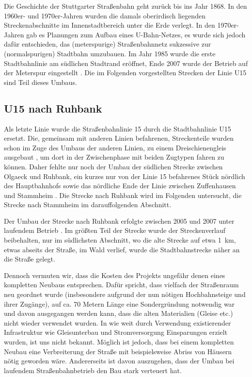 Die Geschichte der Stuttgarter Straßenbahn geht zurück bis ins Jahr 1868. In den
1960er- und 1970er-Jahren wurden die damals oberirdisch liegenden
Streckenabschnitte im Innenstadtbereich unter die Erde verlegt. In den
1970er-Jahren gab es Planungen zum Aufbau eines U-Bahn-Netzes, es wurde sich
jedoch dafür entschieden, das (meterspurige) Straßenbahnnetz sukzessive zur
(normalspurigen) Stadtbahn umzubauen. Im Jahr 1985 wurde die erste
Stadtbahnlinie am südlichen Stadtrand eröffnet, Ende 2007 wurde der Betrieb auf
der Meterspur eingestellt \cite{SSBgeschichte}. Die im Folgenden vorgestellten
Strecken der Linie U15 sind Teil dieses Umbaus.

\subsection*{U15 nach Ruhbank}

Als letzte \cite{u15vorinfo} Linie wurde die Straßenbahnlinie 15 durch die
Stadtbahnlinie U15 ersetzt. Die, gemeinsam mit anderen Linien befahrenen,
Streckenteile wurden schon im Zuge des Umbaus der anderen Linien, zu einem
Dreischienengleis ausgebaut \cite{beob}, um dort in der Zwischenphase mit beiden
Zugtypen fahren zu können. Daher fehlte nur noch der Umbau der südlichen
Strecke zwischen Olgaeck und Ruhbank, ein kurzes nur von der Linie 15 befahrenes
Stück nördlich des Hauptbahnhofs sowie das nördliche Ende der Linie zwischen
Zuffenhausen und Stammheim \cite{u15mail}. Die Strecke nach Ruhbank wird im
Folgenden untersucht, die Strecke nach Stammheim im darauffolgenden Abschnitt.

Der Umbau der Strecke nach Ruhbank erfolgte zwischen 2005 und 2007 unter
laufendem Betrieb \cite{u15seb}. Im größten Teil der Strecke wurde der
Streckenverlauf beibehalten, nur im südlichsten Abschnitt, wo die alte Strecke
auf etwa 1{\ }km, etwas abseits der Straße, im Wald verlief, wurde die
Stadtbahnstrecke näher an die Straße gelegt.

Dennoch vermuten wir, dass die Kosten des Projekts ungefähr denen eines
kompletten Neubaus entsprechen. Dafür spricht, dass vielfach der Straßenraum
neu geordnet wurde (insbesondere aufgrund der nun nötigen Hochbahnsteige und
ihrer Zugänge), auf ca. 70 Metern Länge eine Sondergründung notwendig war
\cite{u15mail} und davon ausgegangen werden kann, dass die alten Materialien
(Gleise etc.) nicht wieder verwendet wurden. In wie weit durch Verwendung
existierender Infrastruktur wie Gleisunterbau und Stromversorgung Einsparungen
erzielt wurden, ist uns nicht bekannt. Möglich ist jedoch, dass bei einem
kompletten Neubau eine Verbreiterung der Straße mit beispielsweise Abriss von
Häusern nötig geworden wäre.  Andererseits ist davon auszugehen, dass der Umbau
bei laufendem Straßenbahnbetrieb den Bau stark verteuert hat.

